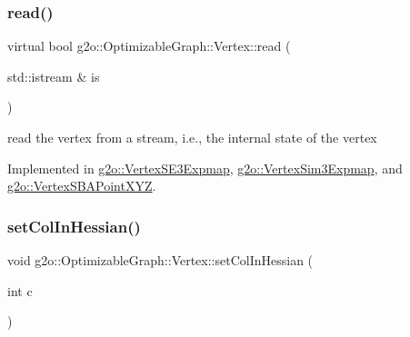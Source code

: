 \mbox{\label{classg2o_1_1_optimizable_graph_1_1_vertex_a356c40d33c3f1e07afa938dfb4870230}} 
\subsubsection{\texorpdfstring{read()}{read()}}
{\footnotesize\ttfamily virtual bool g2o\+::\+Optimizable\+Graph\+::\+Vertex\+::read (\begin{DoxyParamCaption}\item[{std\+::istream \&}]{is }\end{DoxyParamCaption})\hspace{0.3cm}{\ttfamily [pure virtual]}}



read the vertex from a stream, i.\+e., the internal state of the vertex 



Implemented in \mbox{\hyperlink{classg2o_1_1_vertex_s_e3_expmap_a4f5913373d24ea5963fffc6830406a52}{g2o\+::\+Vertex\+S\+E3\+Expmap}}, \mbox{\hyperlink{classg2o_1_1_vertex_sim3_expmap_a16b4ef216ad1c4709a6fc6aa452d8e61}{g2o\+::\+Vertex\+Sim3\+Expmap}}, and \mbox{\hyperlink{classg2o_1_1_vertex_s_b_a_point_x_y_z_a3668aa23ed3fc7e2c3e6bddda7ddcd1a}{g2o\+::\+Vertex\+S\+B\+A\+Point\+X\+YZ}}.

\mbox{\label{classg2o_1_1_optimizable_graph_1_1_vertex_aa605891d46b99ed97accf659f10bc8d5}} 
\subsubsection{\texorpdfstring{set\+Col\+In\+Hessian()}{setColInHessian()}}
{\footnotesize\ttfamily void g2o\+::\+Optimizable\+Graph\+::\+Vertex\+::set\+Col\+In\+Hessian (\begin{DoxyParamCaption}\item[{int}]{c }\end{DoxyParamCaption})\hspace{0.3cm}{\ttfamily [inline]}}



